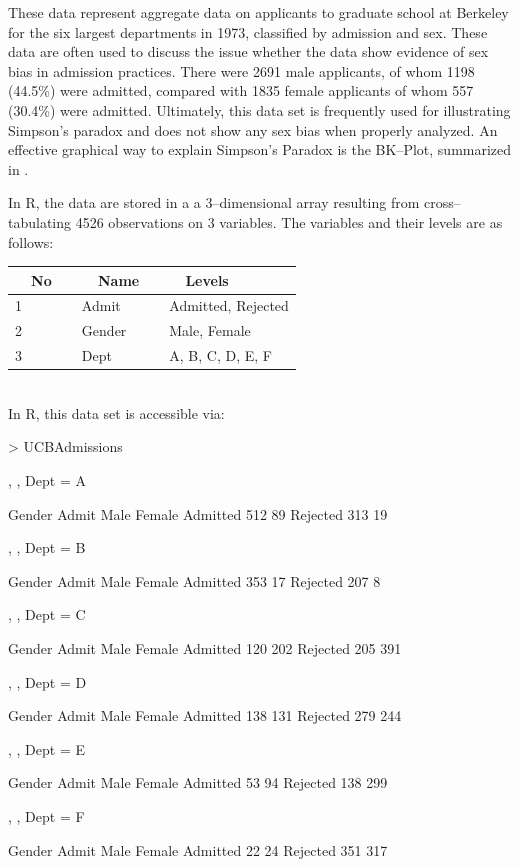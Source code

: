 \documentclass[12pt,letterpaper,final]{article}
\begin{document}
These data represent
aggregate data on applicants to graduate school at Berkeley for the six largest 
departments in 1973, classified by admission and sex. 
These data are often used to discuss the issue whether the data show evidence of sex bias 
in admission practices. There were 2691 male applicants, of whom 1198 (44.5\%) 
were admitted, compared with 1835 female applicants of whom 557 (30.4\%) were admitted. 
Ultimately, this data set is frequently used for illustrating Simpson's paradox and does
not show any sex bias when properly analyzed. 
An effective graphical way to explain Simpson's Paradox is the BK--Plot,
summarized in \cite{Wa2002}.

In R, the data are stored in a a 3--dimensional array 
resulting from cross--tabulating 4526 observations on 3 variables. 
The variables and their levels are as follows: \\
\begin{center}
\begin{tabular}{l|l|l}
~~No~~ & ~~Name~~ & ~~Levels~~ \\
\hline   
1 & Admit & Admitted, Rejected \\
2 & Gender & Male, Female \\
3 & Dept & A, B, C, D, E, F \\
\end{tabular}
\end{center} ~\\


In R, this data set is accessible via:
\begin{Schunk}
\begin{Sinput}
> UCBAdmissions
\end{Sinput}
\begin{Soutput}
, , Dept = A

          Gender
Admit      Male Female
  Admitted  512     89
  Rejected  313     19

, , Dept = B

          Gender
Admit      Male Female
  Admitted  353     17
  Rejected  207      8

, , Dept = C

          Gender
Admit      Male Female
  Admitted  120    202
  Rejected  205    391

, , Dept = D

          Gender
Admit      Male Female
  Admitted  138    131
  Rejected  279    244

, , Dept = E

          Gender
Admit      Male Female
  Admitted   53     94
  Rejected  138    299

, , Dept = F

          Gender
Admit      Male Female
  Admitted   22     24
  Rejected  351    317
\end{Soutput}
\end{Schunk}
\end{document}
